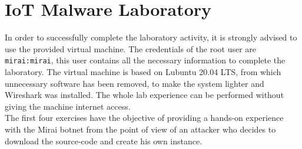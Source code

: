 \chapter{IoT Malware Laboratory}
In order to successfully complete the laboratory activity, it is strongly advised to use the provided virtual machine. The credentials of the root user are \texttt{mirai:mirai}, this user contains all the necessary information to complete the laboratory. The virtual machine is based on Lubuntu 20.04 LTS, from which unnecessary software has been removed, to make the system lighter and Wireshark was installed. The whole lab experience can be performed without giving the machine internet access. \\
The first four exercises have the objective of providing a hands-on experience with the Mirai botnet from the point of view of an attacker who decides to download the source-code and create his own instance.

